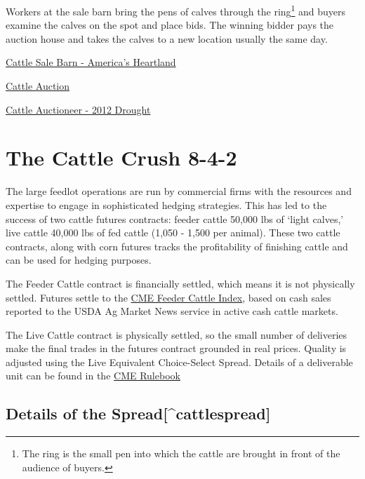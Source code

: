 \documentclass[
]{book}
\begin{document}
Workers at the sale barn bring the pens of calves through the ring\footnote{The ring is the small pen into which the cattle are brought in front of the audience of buyers.} and buyers examine the calves on the spot and place bids. The winning bidder pays the auction house and takes the calves to a new location usually the same day.

\href{https://www.youtube.com/watch?v=m0iiTk3MQ3k}{Cattle Sale Barn - America's Heartland}

\href{https://www.youtube.com/watch?v=ACKT5jWJHTI}{Cattle Auction}

\href{https://www.youtube.com/watch?v=Ig514nyWQho}{Cattle Auctioneer - 2012 Drought}

\hypertarget{the-cattle-crush-8-4-2}{%
\section{The Cattle Crush 8-4-2}\label{the-cattle-crush-8-4-2}}

The large feedlot operations are run by commercial firms with the resources and expertise to engage in sophisticated hedging strategies. This has led to the success of two cattle futures contracts: feeder cattle 50,000 lbs of `light calves,' live cattle 40,000 lbs of fed cattle (1,050 - 1,500 per animal). These two cattle contracts, along with corn futures tracks the profitability of finishing cattle and can be used for hedging purposes.

The Feeder Cattle contract is financially settled, which means it is not physically settled. Futures settle to the \href{http://www.cmegroup.com/market-data/reports/cash-settled-commodity-index-prices.html}{CME Feeder Cattle Index}, based on cash sales reported to the USDA Ag Market News service in active cash cattle markets.

The Live Cattle contract is physically settled, so the small number of deliveries make the final trades in the futures contract grounded in real prices. Quality is adjusted using the Live Equivalent Choice-Select Spread. Details of a deliverable unit can be found in the \href{http://www.cmegroup.com/rulebook/CME/II/100/101/101.pdf}{CME Rulebook}

\hypertarget{details-of-the-spreadcattlespread}{%
\subsection{Details of the Spread{[}\^{}cattlespread{]}}\label{details-of-the-spreadcattlespread}}
\end{document}
